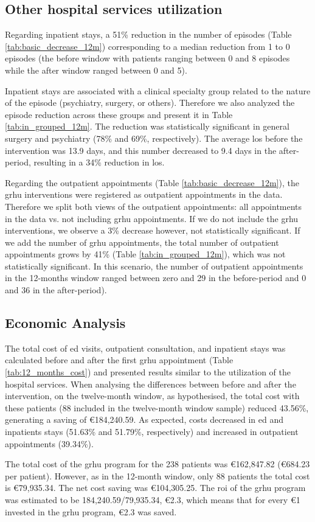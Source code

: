 \documentclass{bmcart}
\begin{document}
\subsection*{Other hospital services utilization}
Regarding inpatient stays, a 51\% reduction in the number of episodes (Table \ref{tab:basic_decrease_12m}) corresponding to a median reduction from 1 to 0 episodes (the before window with patients ranging between 0 and 8 episodes while the after window ranged between 0 and 5). 
\par Inpatient stays are associated with a clinical specialty group related to the nature of the episode (\eg psychiatry, surgery, or others).
Therefore we also analyzed the episode reduction across these groups and present it in Table \ref{tab:in_grouped_12m}. The reduction was statistically significant in general surgery and psychiatry (78\% and 69\%, respectively).
The average \gls{los} before the intervention was 13.9 days, and this number decreased to 9.4 days in the after-period, resulting in a 34\% reduction in \gls{los}.
\par Regarding the outpatient appointments (Table \ref{tab:basic_decrease_12m}), the \gls{grhu} interventions were registered as outpatient appointments in the data. 
Therefore we split both views of the outpatient appointments: all appointments in the data vs. not including \gls{grhu} appointments. 
If we do not include the \gls{grhu} interventions, we observe a 3\% decrease however, not statistically significant. If we add the number of \gls{grhu} appointments, the total number of outpatient appointments grows by 41\%
(Table \ref{tab:in_grouped_12m}), which was not statistically significant. In this scenario, the number of outpatient appointments in the 12-months window ranged between zero and 29 in the before-period and 0 and 36 in the after-period). 


\subsection*{Economic Analysis}
\par The total cost of \gls{ed} visits, outpatient consultation, and inpatient stays was calculated before and after the first \gls{grhu} appointment (Table  \ref{tab:12_months_cost}) and presented results similar to the utilization of the hospital services. When analysing the differences between before and after the intervention, on the twelve-month window, as hypothesised, the total cost with these patients (88 included in the twelve-month window sample) reduced 43.56\%, generating a saving of €184,240.59. As expected, costs decreased in \gls{ed} and inpatients stays (51.63\% and 51.79\%, respectively) and increased in outpatient appointments (39.34\%). 
\par The total cost of the \gls{grhu} program for the 238 patients was €162,847.82 (€684.23 per patient). However, as in the 12-month window, only 88 patients the total cost is €79,935.34. The net cost saving was €104,305.25. The \gls{roi} of the \gls{grhu} program was estimated to be 184,240.59/79,935.34, €2.3, which means that for every €1 invested in the \gls{grhu} program, €2.3 was saved. 
\end{document}
